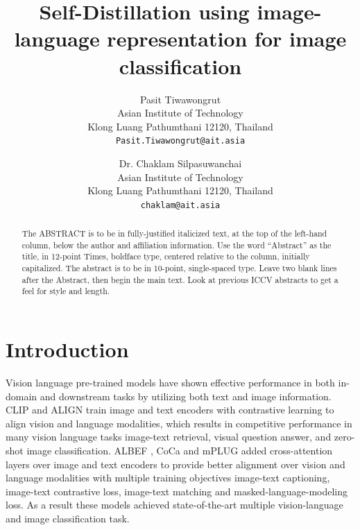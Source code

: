 \documentclass[10pt,twocolumn,letterpaper]{article}
\begin{document}
\title{Self-Distillation using image-language representation for image classification}

\author{Pasit Tiwawongrut\\
Asian Institute of Technology\\
Klong Luang Pathumthani 12120, Thailand\\
{\tt\small Pasit.Tiwawongrut@ait.asia}
\and
Dr. Chaklam Silpasuwanchai\\
Asian Institute of Technology\\
Klong Luang Pathumthani 12120, Thailand\\
{\tt\small chaklam@ait.asia}
}

\maketitle
\ificcvfinal\thispagestyle{empty}\fi

\begin{abstract}
   The ABSTRACT is to be in fully-justified italicized text, at the top
   of the left-hand column, below the author and affiliation
   information. Use the word ``Abstract'' as the title, in 12-point
   Times, boldface type, centered relative to the column, initially
   capitalized. The abstract is to be in 10-point, single-spaced type.
   Leave two blank lines after the Abstract, then begin the main text.
   Look at previous ICCV abstracts to get a feel for style and length.
\end{abstract}

\section{Introduction}

Vision language pre-trained models have shown effective performance in both in-domain and downstream tasks by utilizing both text and image information.
CLIP \cite{clip} and ALIGN \cite{align} train image and text encoders with contrastive learning to align vision and language modalities, which results in competitive performance in many vision language tasks \eg image-text retrieval, visual question answer, and zero-shot image classification.
ALBEF \cite{albef}, CoCa \cite{coca} and mPLUG \cite{mplug} added cross-attention layers over image and text encoders to provide better alignment over vision and language modalities with multiple training objectives \eg image-text captioning, image-text contrastive loss, image-text matching and masked-language-modeling loss.
As a result these models achieved state-of-the-art multiple vision-language and image classification task.
\end{document}
